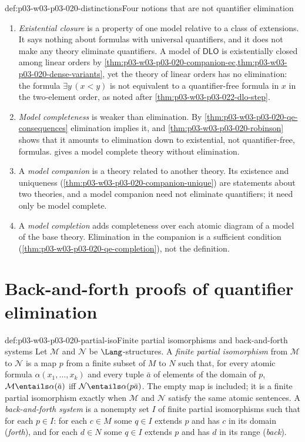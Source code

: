 \begin{hbwarning}{def:p03-w03-p03-020-distinctions}{Four notions that are not quantifier elimination}
\begin{enumerate}
\item \emph{Existential closure} is a property of one model relative to a
  class of extensions. It says nothing about formulas with universal
  quantifiers, and it does not make any theory eliminate quantifiers. A model
  of \(\mathsf{DLO}\) is existentially closed among linear orders by
  \cref{thm:p03-w03-p03-020-companion-ec,thm:p03-w03-p03-020-dense-variants},
  yet the theory of linear orders has no elimination: the formula
  \(\exists y\,(x<y)\) is not equivalent to a quantifier-free formula in
  \(x\) in the two-element order, as noted after
  \cref{thm:p03-w03-p03-022-dlo-step}.
\item \emph{Model completeness} is weaker than elimination. By
  \cref{thm:p03-w03-p03-020-qe-consequences} elimination implies it, and
  \cref{thm:p03-w03-p03-020-robinson} shows that it amounts to elimination
  down to existential, not quantifier-free, formulas.
   gives a model complete theory
  without elimination.
\item A \emph{model companion} is a theory related to another theory. Its
  existence and uniqueness (\cref{thm:p03-w03-p03-020-companion-unique}) are
  statements about two theories, and a model companion need not eliminate
  quantifiers; it need only be model complete.
\item A \emph{model completion} adds completeness over each atomic diagram
  of a model of the base theory. Elimination in the companion is a sufficient
  condition (\cref{thm:p03-w03-p03-020-qe-completion}), not the definition.
\end{enumerate}
\end{hbwarning}

\section{Back-and-forth proofs of quantifier elimination}
\label{sec:p03-w03-p03-020-back-forth}

\begin{hbdefinition}{def:p03-w03-p03-020-partial-iso}{Finite partial isomorphisms and back-and-forth systems}
Let \(\mathcal M\) and \(\mathcal N\) be \(\Lang\)-structures. A
\emph{finite partial isomorphism} from \(\mathcal M\) to \(\mathcal N\) is
a map \(p\) from a finite subset of \(M\) to \(N\) such that, for every
atomic formula \(\alpha(x_1,\ldots,x_k)\) and every tuple \(\bar a\) of
elements of the domain of \(p\),
\(\mathcal M\entails\alpha(\bar a)\) iff
\(\mathcal N\entails\alpha(p\bar a)\). The empty map is included; it is a
finite partial isomorphism exactly when \(\mathcal M\) and \(\mathcal N\)
satisfy the same atomic sentences. A \emph{back-and-forth system} is a
nonempty set \(I\) of finite partial isomorphisms such that for each
\(p\in I\): for each \(c\in M\) some \(q\in I\) extends \(p\) and has \(c\)
in its domain (\emph{forth}), and for each \(d\in N\) some \(q\in I\)
extends \(p\) and has \(d\) in its range (\emph{back}).
\end{hbdefinition}

